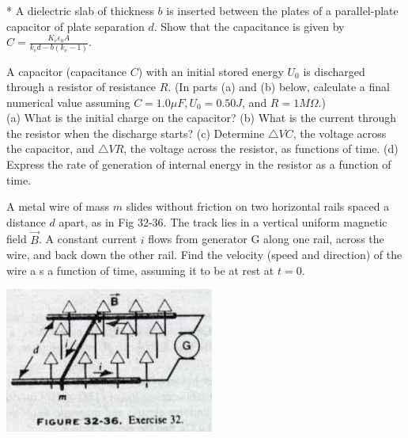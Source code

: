 \documentclass[11pt,letterpaper,boxed]{hmcpset}
\begin{document}
	\begin{problem}* A dielectric slab of thickness $b$ is inserted between the plates of a parallel-plate capacitor of plate separation $d$. Show that the capacitance is given by $C = \frac{K_e \epsilon_0 A}{k_e d -b(k_e -1)}$.
		
	\end{problem}
	
	\begin{solution}
		\vfill
	\end{solution}
	\newpage	
	
	\begin{problem}[HRK 31.48] A capacitor (capacitance $C$) with an initial stored energy $U_0$ is discharged
through a resistor of resistance $R$. (In parts (a) and (b) below, calculate a final numerical value
assuming $C =1.0 \mu F, U_0 = 0.50 J$, and $R=1 M\Omega$.)\\
(a) What is the initial charge on the capacitor?
(b) What is the current through the resistor when the discharge starts?
(c) Determine $\bigtriangleup VC$, the voltage across the capacitor, and $\bigtriangleup VR$, the voltage across the resistor, as
functions of time.
(d) Express the rate of generation of internal energy in the resistor as a function of time.
	\end{problem}
	
	\begin{solution}
		\vfill
	\end{solution}
	\newpage
	
	\begin{problem}[HRK E32.32]
A metal wire of mass $m$ slides without friction on two horizontal rails spaced a distance $d$ apart, as in Fig 32-36. The track lies in a vertical uniform magnetic field $\vec{B}$. A constant current $i$ flows from generator G along one rail, across the wire, and back down the other rail. Find the velocity (speed and direction) of the wire a s a function of time, assuming it to be at rest at $t = 0$.
\begin{center}
			\includegraphics[scale=.7]{51m7pic2.jpg}
	\end{center}
		
	\end{problem}
	
\end{document}
